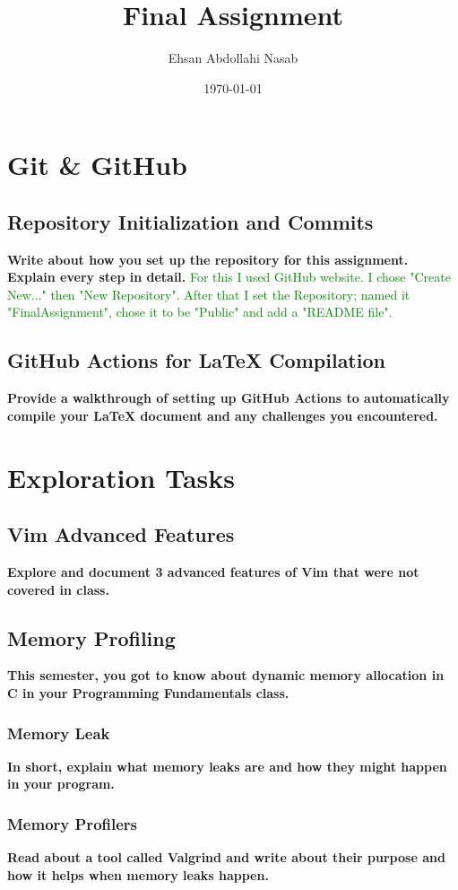 \documentclass{article}
\title{Final Assignment}
\author{Ehsan Abdollahi Nasab}
\date{\today}
\begin{document}
\maketitle

\section{Git & GitHub}
\subsection{Repository Initialization and Commits}
\textbf{Write about how you set up the repository for this assignment. Explain every step in detail.}
\textcolor{green}{For this I used GitHub website. I chose "Create New..." then "New Repository". After that I set the Repository; named it "FinalAssignment", chose it to be "Public" and add a "README file".}

\subsection{GitHub Actions for LaTeX Compilation}
\textbf{Provide a walkthrough of setting up GitHub Actions to automatically compile your LaTeX document and any challenges you encountered.}
\textcolor{green}{}

\section{Exploration Tasks}
\subsection{Vim Advanced Features}
\textbf{Explore and document 3 advanced features of Vim that were not covered in class.}
\textcolor{green}{}
\subsection{Memory Profiling}
\textbf{This semester, you got to know about dynamic memory allocation in C in your Programming Fundamentals class.}
\textcolor{green}{}
\subsubsection{Memory Leak}
\textbf{In short, explain what memory leaks are and how they might happen in your program.}
\textcolor{green}{}
\subsubsection{Memory Profilers}
\textbf{Read about a tool called Valgrind and write about their purpose and how it helps when memory leaks happen.}
\textcolor{green}{}
\end{document}
